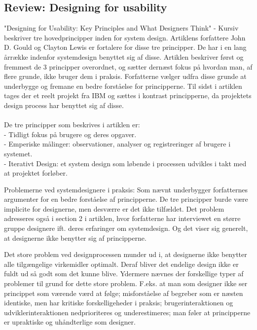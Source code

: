 \documentclass[a4paper,12pt]{article}
\begin{document}
\subsection{Review: Designing for usability}
"Designing for Usability: Key Principles and What Designers Think" - Kursiv
beskriver tre hovedprincipper inden for system design. Artiklens forfattere John D. Gould og Clayton Lewis er fortalere for disse tre principper. De har i en lang årrække indenfor systemdesign benyttet sig af disse.
Artiklen beskriver først og fremmest de 3 principper overordnet, og sætter dernæst fokus på hvordan man, af flere grunde, ikke bruger dem i praksis. Forfatterne vælger udfra disse grunde at underbygge og fremane en bedre forståelse for principperne. Til sidst i artiklen tages der et reelt projekt fra IBM og sættes i kontrast principperne, da projektets design process har benyttet sig af disse.
\\
\\
De tre principper som beskrives i artiklen er:
\\
- Tidligt fokus på brugere og deres opgaver.
\\
- Emperiske målinger: observationer, analyser og registreringer af brugere i systemet.
\\
- Iterativt Design: et system design som løbende i processen udvikles i takt med at projektet forløber.\cite[side~300]{dfu}

Problemerne ved systemdesignere i praksis:
Som nævnt underbygger forfatternes argumenter for en bedre forståelse af principperne.
De tre principper burde være implicite for designerne, men desværre er det ikke tilfældet. Det problem adresseres også i section 2 i artiklen, hvor forfatterne har interviewet en større gruppe designere ift. deres erfaringer om systemdesign. Og det viser sig generelt, at designerne ikke benytter sig af principperne.\cite[side~301]{dfu}

Det store problem ved designprocessen munder ud i, at designerne ikke benytter alle tilgængelige virkemidler optimalt. Deraf bliver det endelige design ikke er fuldt ud så godt som det kunne blive. Ydermere nævnes der forskellige typer af problemer til grund for dette store problem. F.eks. at man som designer ikke ser princippet som værende værd at følge; misforståelse af begreber som er næsten identiske, men har kritiske forskelligeheder i praksis; brugerinteraktionen og udviklerinteraktionen nedprioriteres og underestimeres; man føler at principperne er upraktiske og uhåndterlige som designer. \cite[side~303]{dfu}
\end{document}
